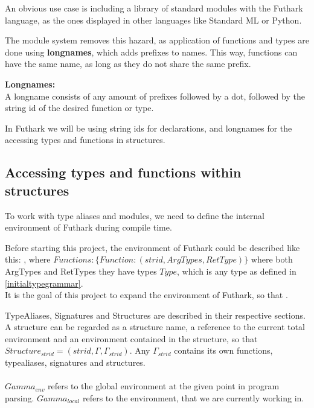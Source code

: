 An obvious use case is including a library of standard modules with the Futhark
language, as the ones displayed in other languages like Standard
ML\cite{sml_standard_lib} or Python\cite{python3_docs}.

The module system removes this hazard, as application of functions and types are
done using \textbf{longnames}, which adds prefixes to names. This way, functions
can have the same name, as long as they do not share the same prefix.

\begin{tcolorbox}
\textbf{Longnames:}\\
A longname consists of any amount of prefixes followed by a dot, followed by the
string id of the desired function or type.

In Futhark we will be using string ids for declarations, and longnames for
the accessing types and functions in structures.
\end{tcolorbox}


\subsection{Accessing types and functions within structures}

To work with type aliases and modules, we need to define the internal
environment of Futhark during compile time.

Before starting this project, the environment of Futhark could be described like
this:
, where $Functions : \{ Function : (strid,
  ArgTypes, RetType) \}$ where both ArgTypes and RetTypes they
have types $Type$, which is any type as defined in
\ref{initialtypegrammar}.\\

It is the goal of this project to expand the environment of Futhark, so that
.

TypeAliases, Signatures and Structures are described in their respective
sections. A structure can be regarded as a structure name, a reference to the
current total environment and an environment contained in the structure, so that
$Structure_{strid} = (strid, \Gamma,  \Gamma_{strid})$. Any $\Gamma_{strid}$
contains its own functions, typealiases, signatures and structures.\\
\\
$Gamma_{env}$ refers to the global environment at the given point in program
parsing.
$Gamma_{local}$ refers to the environment, that we are currently working in.



